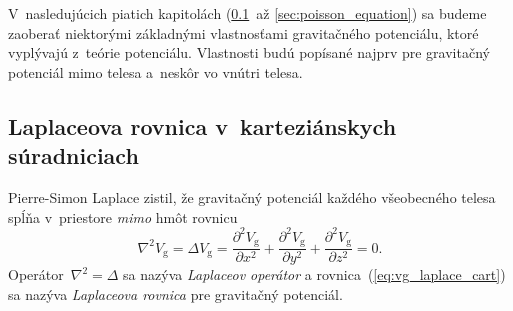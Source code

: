 \documentclass[a4paper,12pt]{book}
\newcommand{\gidx}{\mathrm g}
\begin{document}
V~nasledujúcich piatich kapitolách (\ref{sec:laplace_equation_cart}~až 
\ref{sec:poisson_equation}) sa budeme zaoberať niektorými základnými
vlastnosťami gravitačného potenciálu, ktoré vyplývajú z~teórie potenciálu.
Vlastnosti budú popísané najprv pre gravitačný potenciál mimo telesa a~neskôr 
vo vnútri telesa.





\subsection{Laplaceova rovnica v~karteziánskych súradniciach}
\label{sec:laplace_equation_cart}

Pierre-Simon Laplace zistil, že gravitačný potenciál každého všeobecného telesa
spĺňa v~priestore \emph{mimo} hmôt rovnicu
%
\begin{equation}
\label{eq:vg_laplace_cart}
\nabla^2 V_\gidx = \Delta V_\gidx = \frac{\partial^2 V_\gidx}{\partial x^2}
+ \frac{\partial^2 V_\gidx}{\partial y^2} + \frac{\partial^2 V_\gidx}{\partial
z^2} = 0{.}
\end{equation}
%
Operátor~$\nabla^2 = \Delta$ sa nazýva \emph{Laplaceov operátor} 
a rovnica~(\ref{eq:vg_laplace_cart}) sa nazýva \emph{Laplaceova rovnica} pre
gravitačný potenciál.
\end{document}
